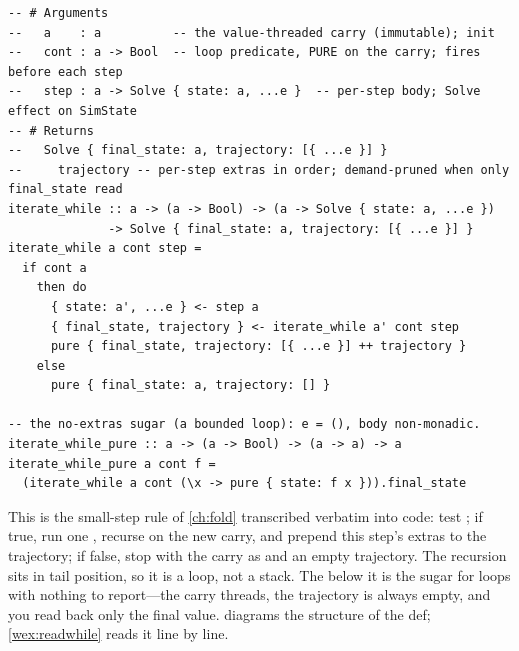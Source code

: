 \begin{lstlisting}[style=l4style]
-- # Arguments
--   a    : a          -- the value-threaded carry (immutable); init
--   cont : a -> Bool  -- loop predicate, PURE on the carry; fires before each step
--   step : a -> Solve { state: a, ...e }  -- per-step body; Solve effect on SimState
-- # Returns
--   Solve { final_state: a, trajectory: [{ ...e }] }
--     trajectory -- per-step extras in order; demand-pruned when only final_state read
iterate_while :: a -> (a -> Bool) -> (a -> Solve { state: a, ...e })
              -> Solve { final_state: a, trajectory: [{ ...e }] }
iterate_while a cont step =
  if cont a
    then do
      { state: a', ...e } <- step a
      { final_state, trajectory } <- iterate_while a' cont step
      pure { final_state, trajectory: [{ ...e }] ++ trajectory }
    else
      pure { final_state: a, trajectory: [] }

-- the no-extras sugar (a bounded loop): e = (), body non-monadic.
iterate_while_pure :: a -> (a -> Bool) -> (a -> a) -> a
iterate_while_pure a cont f =
  (iterate_while a cont (\x -> pure { state: f x })).final_state
\end{lstlisting}
This is the small-step rule of \cref{ch:fold} transcribed verbatim into code: test
; if true, run one , recurse on the new carry, and prepend
this step's extras to the trajectory; if false, stop with the carry as
 and an empty trajectory. The recursion sits in tail position, so
it is a loop, not a stack. The  below it is the sugar for
loops with nothing to report---the carry threads, the trajectory is always empty,
and you read back only the final value.  diagrams the
structure of the def; \cref{wex:readwhile} reads it line by line.

